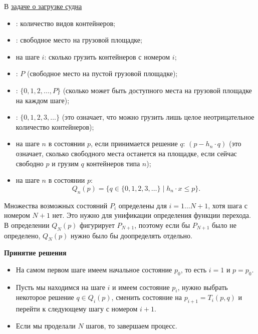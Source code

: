 \begin{note}
	В \hyperref[pr:loading_vessel]{задаче о загрузке судна}
	
	\begin{itemize}[nosep]
		\item {}: количество видов контейнеров;
		
		\item {}: свободное место на грузовой площадке;
		
		\item {} на шаге $i$: сколько грузить контейнеров с номером $i$;
		
		\item {}: $P$ (свободное место на пустой грузовой площадке);
		
		\item {}: $\{0, 1, 2, \dots, P\}$ (сколько может быть доступного места на грузовой площадке на каждом шаге);
		
		\item {}: $\{0, 1, 2, 3, \dots\}$ (это означает, что можно грузить лишь целое неотрицательное количество контейнеров);
		
		\item {} на шаге $n$ в состоянии $p$, если принимается решение $q$: $(p - h_n \cdot q)$ (это означает, сколько свободного места останется на площадке, если сейчас свободно $p$ и грузим $q$ контейнеров типа $n$);
		
		\item {} на шаге $n$ в состоянии $p$: 
		\[
		Q_n(p) = \big\{q \in \{0, 1, 2, 3, \dots\} \; \big| \; h_n \cdot x \le p\big\}.
		\]
	\end{itemize}
\end{note}

\begin{note}
	Множества возможных состояний $P_i$ определены для $i = 1 \dots N+1$, хотя шага с номером $N+1$ нет. Это нужно для унификации определения функции перехода. В определении $Q_N(p)$ фигурирует $P_{N+1}$, поэтому если бы $P_{N+1}$ было не определено, $Q_N(p)$ нужно было бы доопределять отдельно.
\end{note}

\textbf{Принятие решения}

\begin{itemize}[nosep]
	\item На самом первом шаге имеем начальное состояние $p_0$, то есть $i=1$ и $p = p_0$.
	
	\item Пусть мы находимся на шаге $i$ и имеем состояние $p_i$, нужно выбрать некоторое решение $q \in Q_i(p)$, сменить состояние на $p_{i+1} = T_i(p, q)$ и перейти к следующему шагу с номером $i+1$.
	
	\item Если мы проделали $N$ шагов, то завершаем процесс.
\end{itemize}

